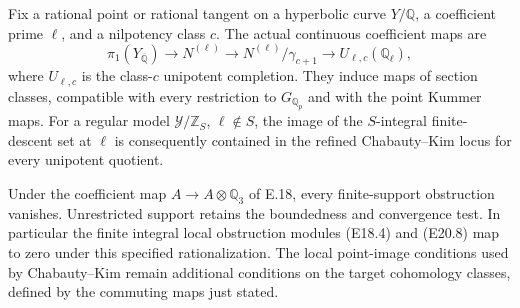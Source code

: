 \begin{proposition}
\label{E-Kim-comparison}
Fix a rational point or rational tangent on a
hyperbolic curve $Y/\mathbb Q$, a coefficient
prime $\ell$, and a nilpotency class $c$.
The actual continuous coefficient maps are
\[
 \pi_1(Y_{\overline{\mathbb Q}})
 \longrightarrow N^{(\ell)}
 \longrightarrow N^{(\ell)}/\gamma_{c+1}
 \longrightarrow U_{\ell,c}(\mathbb Q_\ell),
 \tag{E22.1}
\]
where $U_{\ell,c}$ is the class-$c$ unipotent
completion. They induce maps of section
classes, compatible with every restriction
to $G_{\mathbb Q_p}$ and with the point
Kummer maps. For a regular model
$\mathcal Y/\mathbb Z_S$, $\ell\notin S$,
the image of the $S$-integral finite-descent
set at $\ell$ is consequently contained
in the refined Chabauty--Kim locus for
every unipotent quotient.

Under the coefficient map $A\to A\otimes\mathbb Q_3$
of E.18, every finite-support obstruction
vanishes. Unrestricted support retains
the boundedness and convergence test.
In particular the finite integral local
obstruction modules (E18.4) and (E20.8)
map to zero under this specified
rationalization. The local point-image
conditions used by Chabauty--Kim remain
additional conditions on the target
cohomology classes, defined by the
commuting maps just stated.
\end{proposition}

